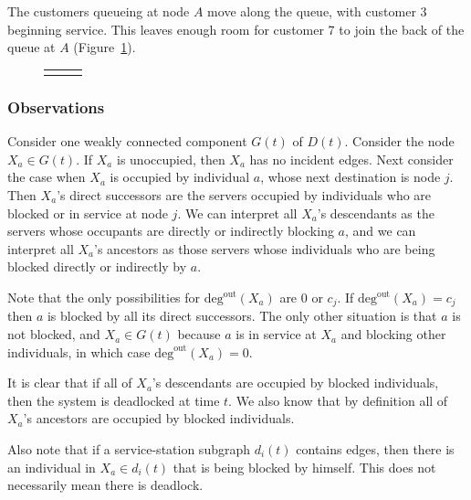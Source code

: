 \documentclass{article}
\begin{document}
The customers queueing at node $A$ move along the queue, with customer 3 beginning service.
This leaves enough room for customer 7 to join the back of the queue at $A$ (Figure~\ref{fig:general_builddown_4}).

\begin{figure}[H]
  \begin{center}
    \begin{tabular}{ c c c }
       & \hspace{0.1\textwidth} &
       \\
  \end{tabular}
  \end{center}
  \caption{}
  \label{fig:general_builddown_4}
\end{figure}

\subsubsection{Observations}

Consider one weakly connected component $G(t)$ of $D(t)$.
Consider the node $X_a \in G(t)$. If $X_a$ is unoccupied, then $X_a$ has no incident edges.
Next consider the case when $X_a$ is occupied by individual $a$, whose next destination is node $j$.
Then $X_a$'s direct successors are the servers occupied by individuals who are blocked or in service at node $j$.
We can interpret all $X_a$'s descendants as the servers whose occupants are directly or indirectly blocking $a$, and we can interpret all $X_a$'s ancestors as those servers whose individuals who are being blocked directly or indirectly by $a$.

Note that the only possibilities for $\text{deg}^{\text{out}}(X_a)$ are 0 or $c_j$.
If $\text{deg}^{\text{out}}(X_a) = c_j$ then $a$ is blocked by all its direct successors.
The only other situation is that $a$ is not blocked, and $X_a \in G(t)$ because $a$ is in service at $X_a$ and blocking other individuals, in which case $\text{deg}^{\text{out}}(X_a) = 0$.

It is clear that if all of $X_a$'s descendants are occupied by blocked individuals, then the system is deadlocked at time $t$.
We also know that by definition all of $X_a$'s ancestors are occupied by blocked individuals.

Also note that if a service-station subgraph $d_i(t)$ contains edges, then there is an individual in $X_a \in d_i(t)$ that is being blocked by himself.
This does not necessarily mean there is deadlock.
\end{document}
